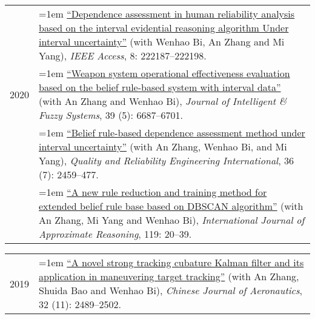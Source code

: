 \documentclass[11pt,english]{article}
\begin{document}
\begin{tabular}{p{.85in}>{\hangindent=1em}p{5.65in}<{\raggedright}}
 &  \href{https://doi.org/10.1109/ACCESS.2020.3043848}{``Dependence assessment in human reliability analysis based on the interval evidential reasoning algorithm Under interval uncertainty''} (with Wenhao Bi, An Zhang and Mi Yang), \textit{IEEE Access}, 8: 222187--222198. \\

2020 &  \href{https://doi.org/10.3233/JIFS-190651}{``Weapon system operational effectiveness evaluation based on the belief rule-based system with interval data''} (with An Zhang and Wenhao Bi), \textit{Journal of Intelligent \& Fuzzy Systems}, 39 (5): 6687--6701. \\
 &  \href{https://doi.org/10.1002/qre.2708}{``Belief rule-based dependence assessment method under interval uncertainty''} (with An Zhang, Wenhao Bi, and Mi Yang), \textit{Quality and Reliability Engineering International}, 36 (7): 2459--477. \\
 &  \href{https://doi.org/10.1016/j.ijar.2019.12.016}{``A new rule reduction and training method for extended belief rule base based on DBSCAN algorithm''} (with An Zhang, Mi Yang and Wenhao Bi), \textit{International Journal of Approximate Reasoning}, 119: 20--39. \\
 \end{tabular}
\begin{tabular}{p{.85in}>{\hangindent=1em}p{5.65in}<{\raggedright}}
2019 &  \href{https://doi.org/10.1016/j.cja.2019.07.025}{``A novel strong tracking cubature Kalman filter and its application in maneuvering target tracking''} (with An Zhang, Shuida Bao and Wenhao Bi), \textit{Chinese Journal of Aeronautics}, 32 (11): 2489--2502. \\
\end{tabular}
\end{document}
